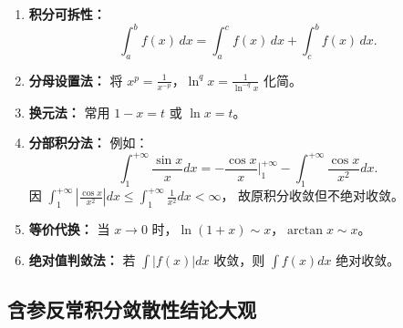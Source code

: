 \begin{enumerate}
    \item \textbf{积分可拆性：}
          \[
              \int_{a}^{b} f(x)\,dx = \int_{a}^{c} f(x)\,dx + \int_{c}^{b} f(x)\,dx.
          \]

    \item \textbf{分母设置法：}
          将 $x^p=\frac{1}{x^{-p}}$，$\ln^q x=\frac{1}{\ln^{-q}x}$ 化简。

    \item \textbf{换元法：}
          常用 $1-x=t$ 或 $\ln x=t$。

    \item \textbf{分部积分法：}
          例如：
          \[
              \int_{1}^{+\infty}\frac{\sin x}{x}dx
              = -\frac{\cos x}{x}\Big|_1^{+\infty} - \int_{1}^{+\infty}\frac{\cos x}{x^{2}}dx.
          \]
          因 $\displaystyle \int_{1}^{+\infty}\left|\frac{\cos x}{x^{2}}\right|dx\le\int_{1}^{+\infty}\frac{1}{x^{2}}dx<\infty$，
          故原积分收敛但不绝对收敛。

    \item \textbf{等价代换：}
          当 $x\to 0$ 时，$\ln(1+x)\sim x$，$\arctan x\sim x$。

    \item \textbf{绝对值判敛法：}
          若 $\int |f(x)|dx$ 收敛，则 $\int f(x)dx$ 绝对收敛。
\end{enumerate}

\subsection{含参反常积分敛散性结论大观}


